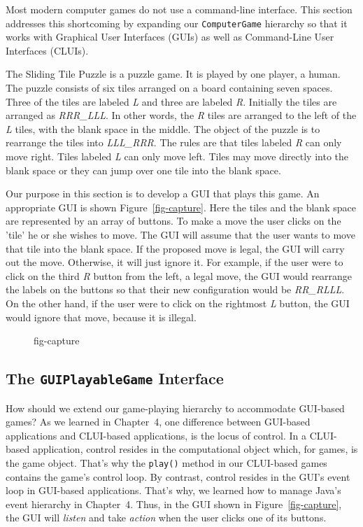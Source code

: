 Most modern computer games do not use a command-line interface.  This
section addresses this shortcoming by expanding our {\tt ComputerGame}
hierarchy so that it works with Graphical User Interfaces (GUIs) as
well as Command-Line User Interfaces (CLUIs).

The Sliding Tile Puzzle is a puzzle game. It is played by one player,
a human. The puzzle consists of six tiles arranged on a board
containing seven spaces. Three of the tiles are labeled {\em L} and
three are labeled {\em R}.  Initially the tiles are arranged as {\em
RRR\_LLL}.  In other words, the {\em R} tiles are arranged to the left
of the {\em L} tiles, with the blank space in the middle. The object
of the puzzle is to rearrange the tiles into {\em LLL\_RRR}. The rules
are that tiles labeled {\em R} can only move right. Tiles labeled {\em
L} can only move left. Tiles may move directly into the blank space or
they can jump over one tile into the blank space.

Our purpose in this section is to develop a GUI that plays this
game. An appropriate GUI is shown Figure~\ref{fig-capture}.  Here the
tiles and the blank space are represented by an array of buttons.  To
make a move the user clicks on the 'tile' he or she wishes to
move. The GUI will assume that the user wants to move that tile into
the blank space. If the proposed move is legal, the GUI will carry out
the move. Otherwise, it will just ignore it. For example, if the user
were to click on the third {\em R} button from the left, a legal move,
the GUI would rearrange the labels on the buttons so that their new
configuration would be {\em RR\_RLLL}. On the other hand, if the user
were to click on the rightmost {\em L} button, the GUI would ignore
that move, because it is illegal.

\begin{figure}[h!]
{fig-capture}
\end{figure}

\subsection{The {\tt GUIPlayableGame} Interface}

How should we extend our game-playing hierarchy to accommodate
GUI-based games? As we learned in Chapter~4, one difference between
GUI-based applications and CLUI-based applications, is the locus of
control. In a CLUI-based application, control resides in the
computational object which, for games, is the game object.  That's why
the {\tt play()} method in our CLUI-based games contains the game's
control loop.  By contrast, control resides in the GUI's event loop in
GUI-based applications.  That's why, we learned how to
manage Java's event hierarchy in Chapter~4. Thus, in the GUI shown in
Figure~\ref{fig-capture}, the GUI will {\em listen} and take {\em
action} when the user clicks one of its buttons.

